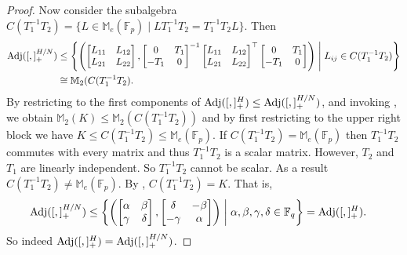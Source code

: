 \documentclass{toc}
\numberwithin{equation}{section}
\theoremstyle{plain}       %
\theoremstyle{remark}
\theoremstyle{definition}
\numberwithin{figure}{section}
\numberwithin{table}{section}
\newcommand{\bbF}{\mathbb{F}}  %
\begin{document}
\begin{proof}
Now consider the subalgebra $C(T_1^{-1}T_2) = \{ L\in \mathbb{M}_e(\bbF_p) 
\mid LT_1^{-1} T_2=T_1^{-1} T_2L \}$.  Then
\begin{align*}
	{\rm Adj}([,]_+^{H/N}) & \leq \left\{
	\left(\begin{bmatrix} L_{11} & L_{12}\\ L_{21} & L_{22} \end{bmatrix},
		\begin{bmatrix}
			0 & T_1 \\
			-T_1 & 0
		\end{bmatrix}^{-1}
	\begin{bmatrix} L_{11} & L_{12}\\
		 L_{21} & L_{22} \end{bmatrix}^{\top}
		 \begin{bmatrix}
			0 & T_1 \\
			-T_1 & 0
		\end{bmatrix}\right) 
		 \;\middle|\;
	L_{ij}\in C(T_1^{-1}T_2)\right\}\\
	& \cong \mathbb{M}_2(C(T_1^{-1}T_2).
\end{align*}
By restricting to the first components of ${\rm Adj}([,]_+^{H})\leq {\rm
Adj}([,]_+^{H/N})$, and invoking , we obtain
$\mathbb{M}_2(K)\leq \mathbb{M}_2(C(T_1^{-1}T_2))$ and by first restricting to
the upper right block we have $K\leq C(T_1^{-1}T_2)\leq \mathbb{M}_e(\bbF_p)$.
If $C(T_1^{-1} T_2)=\mathbb{M}_e(\bbF_p)$ then $T_1^{-1} T_2$ commutes with
every matrix and thus $T_1^{-1} T_2$ is a scalar matrix.  However, $T_2$ and
$T_1$ are linearly independent.  So $T_1^{-1}T_2$ cannot be scalar.  As a result
$C(T_1^{-1}T_2)\neq \mathbb{M}_e(\bbF_p)$.  By ,
$C(T_1^{-1}T_2)=K$.  That is, 
\begin{align*}
	{\rm Adj}([,]_+^{H/N}) & \leq \left\{
		\left(\begin{bmatrix} \alpha & \beta \\ \gamma & \delta\end{bmatrix},
		\begin{bmatrix} \delta & -\beta\\ -\gamma & \alpha\end{bmatrix}\right)
			\;\middle |\;
		\alpha,\beta,\gamma,\delta\in\bbF_q\right\}={\rm Adj}([,]_+^H).
\end{align*}
So indeed ${\rm Adj}([,]_+^H)={\rm Adj}([,]_+^{H/N})$.
\end{proof}
\end{document}
